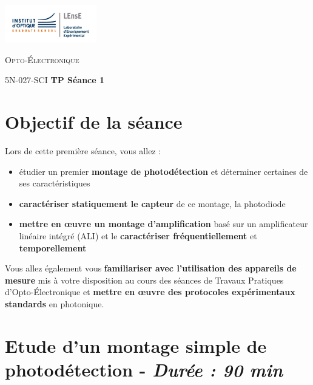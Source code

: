 \newpage

\begin{minipage}[c]{.25\linewidth}
	\includegraphics[width=4cm]{images/LEnsE_IOGS.jpg}
\end{minipage} \hfill
\begin{minipage}[c]{.4\linewidth}

\begin{center}
\vspace{0.3cm}
{\Large \textsc{Opto-Électronique}}

\medskip

5N-027-SCI \qquad \textbf{\Large TP Séance 1}

\end{center}
\end{minipage}\hfill

\section{Objectif de la séance}

Lors de cette première séance, vous allez :

\begin{itemize}
	\item étudier un premier \textbf{montage de photodétection} et déterminer certaines de ses caractéristiques
	\item \textbf{caractériser statiquement le capteur} de ce montage, la photodiode
	\item \textbf{mettre en \oe{}uvre un montage d'amplification} basé sur un amplificateur linéaire intégré (ALI) et le \textbf{caractériser fréquentiellement} et \textbf{temporellement}
\end{itemize} 

\medskip

Vous allez également vous \textbf{familiariser avec l'utilisation des appareils de mesure} mis à
votre disposition au cours des séances de Travaux Pratiques d'Opto-Électronique et \textbf{mettre en \oe{}uvre des protocoles expérimentaux standards} en photonique.

\section{Etude d'un montage simple de photodétection - \textit{Durée : 90 min}}

